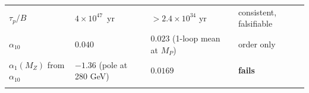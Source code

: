 \documentclass[aps,prd,amsmath,amssymb,superscriptaddress,longbibliography,floatfix,preprint]{revtex4-2}
\begin{document}
{\begin{longtable}{llll}
\arrayrulecolor{black!40}\hline\arrayrulecolor{black}
\parbox[c]{2.63cm}{\vspace{2.5pt}\raggedright {} \mbox{$\tau_p/B$}\vspace{2.5pt}} & \parbox[c]{4.21cm}{\vspace{2.5pt}\raggedright {} \mbox{$4\times10^{47}$ yr}\vspace{2.5pt}} & \parbox[c]{3.01cm}{\vspace{2.5pt}\raggedright {} \mbox{$>2.4\times10^{34}$} yr\vspace{2.5pt}} & \parbox[c]{4.8cm}{\vspace{2.5pt}\raggedright {} consistent, falsifiable\vspace{2.5pt}} \\
\hline{}
\parbox[c]{2.63cm}{\vspace{2.5pt}\raggedright {} \mbox{$\alpha_{10}$}\vspace{2.5pt}} & \parbox[c]{4.21cm}{\vspace{2.5pt}\raggedright {} \mbox{$0.040$}\vspace{2.5pt}} & \parbox[c]{3.01cm}{\vspace{2.5pt}\raggedright {} \mbox{$0.023$} (1-loop mean at \mbox{$M_P$})\vspace{2.5pt}} & \parbox[c]{4.8cm}{\vspace{2.5pt}\raggedright {} order only\vspace{2.5pt}} \\
\hline{}
\parbox[c]{2.63cm}{\vspace{2.5pt}\raggedright {} \mbox{$\alpha_1(M_Z)$} from \mbox{$\alpha_{10}$}\vspace{2.5pt}} & \parbox[c]{4.21cm}{\vspace{2.5pt}\raggedright {} \mbox{$-1.36$} (pole at 280 GeV)\vspace{2.5pt}} & \parbox[c]{3.01cm}{\vspace{2.5pt}\raggedright {} \mbox{$0.0169$}\vspace{2.5pt}} & \parbox[c]{4.8cm}{\vspace{2.5pt}\raggedright {} \textbf{fails}\vspace{2.5pt}} \\
\hline{}

\end{longtable}}
\end{document}
